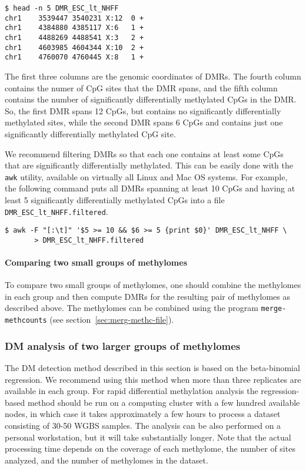 \documentclass[10pt]{article}
\begin{document}
{\small{%
\begin{verbatim}
$ head -n 5 DMR_ESC_lt_NHFF
chr1	3539447	3540231	X:12  0	+
chr1	4384880	4385117	X:6	  1	+
chr1	4488269	4488541	X:3	  2	+
chr1	4603985	4604344	X:10  2	+
chr1	4760070	4760445	X:8   1	+
\end{verbatim}%
}}

The first three columns are the genomic coordinates of DMRs. The fourth
column contains the numer of CpG sites that the DMR spans, and the fifth 
column contains the number of significantly differentially methylated 
CpGs in the DMR. So, the first DMR spans 12 CpGs, but contains no 
significantly differentially methylated sites, while the second DMR spans 
6 CpGs and contains just one significantly differentially methylated CpG 
site.

We recommend filtering DMRs so that each one contains at least some 
CpGs that are significantly differentially methylated. This can be easily 
done with the {\tt awk} utility, available on virtually all Linux and Mac OS 
systems. For example, the following command puts all DMRs spanning 
at least 10 CpGs and having at least 5 significantly differentially 
methylated CpGs into a file {\tt DMR\_ESC\_lt\_NHFF.filtered}.
{\small{%
\begin{verbatim}
$ awk -F "[:\t]" '$5 >= 10 && $6 >= 5 {print $0}' DMR_ESC_lt_NHFF \
       > DMR_ESC_lt_NHFF.filtered
\end{verbatim}%
}}

\paragraph{Comparing two small groups of methylomes} To compare two small 
groups of methylomes, one should combine the methylomes in each group and 
then compute DMRs for the resulting pair of methylomes as described above. 
The methylomes can be combined using the program {\tt merge-methcounts} 
(see section~\ref{sec:merg-methc-file}).

\subsubsection{DM analysis of two larger groups of methylomes}

The DM detection method described in this section is based on the beta-binomial
regression. We recommend using this method when more than three replicates 
are available in each group. For rapid differential methylation analysis the 
regression-based method should be run on a computing cluster with a few
hundred available nodes, in which case it takes approximately a few hours to
process a dataset consisting of 30-50 WGBS samples. The analysis can be also
performed on a personal workstation, but it will take substantially longer. Note
that the actual processing time depends on the coverage of each methylome, the
number of sites analyzed, and the number of methylomes in the dataset.
\end{document}
